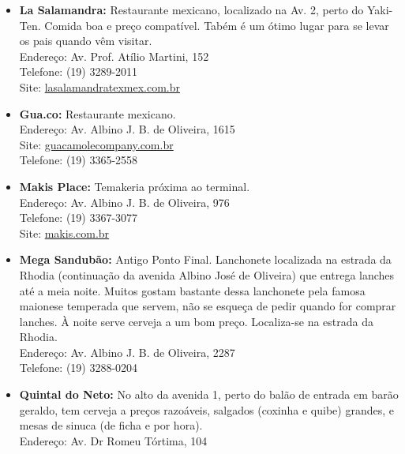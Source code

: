 %
%


\begin{itemize}
    \item   \textbf{La Salamandra:} Restaurante mexicano, localizado na Av. 2,
        perto do Yaki-Ten. Comida boa e preço compatível. Tabém é um ótimo lugar
        para se levar os pais quando vêm visitar.
        \\Endereço: Av. Prof. Atílio Martini, 152
        \\Telefone: (19) 3289-2011
        \\Site: \url{lasalamandratexmex.com.br}

    \item    \textbf{Gua.co:} Restaurante mexicano.
        \\Endereço: Av. Albino J. B. de Oliveira, 1615
        \\Site: \url{guacamolecompany.com.br}
        \\Telefone: (19) 3365-2558

    \item   \textbf{Makis Place:} Temakeria próxima ao terminal.
        \\Endereço: Av. Albino J. B. de Oliveira, 976
        \\Telefone: (19) 3367-3077
        \\Site: \url{makis.com.br}

    \item   \textbf{Mega Sandubão:}
      Antigo Ponto Final. Lanchonete localizada na estrada da Rhodia
      (continuação da avenida Albino José de Oliveira) que entrega lanches até
      a meia noite. Muitos gostam bastante dessa lanchonete pela famosa
      maionese temperada que servem, não se esqueça de pedir quando for comprar
      lanches. À noite serve cerveja a um bom preço. Localiza-se na estrada da
      Rhodia.
        \\Endereço: Av. Albino J. B. de Oliveira, 2287
        \\Telefone: (19) 3288-0204

    \item   \textbf{Quintal do Neto:} No alto da avenida 1, perto do balão de
        entrada em barão geraldo, tem cerveja a preços razoáveis, salgados
        (coxinha e quibe) grandes, e mesas de sinuca (de ficha e por hora).
        \\Endereço: Av. Dr Romeu Tórtima, 104


\end{itemize}
